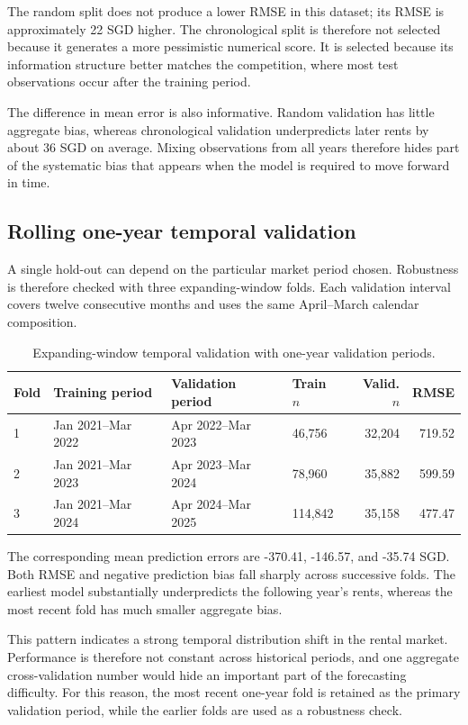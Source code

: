 \documentclass[10pt]{article}
\begin{document}
The random split does not produce a lower RMSE in this dataset; its RMSE is approximately 22 SGD higher.
The chronological split is therefore not selected because it generates a more pessimistic numerical score.
It is selected because its information structure better matches the competition, where most test observations occur after the training period.

The difference in mean error is also informative.
Random validation has little aggregate bias, whereas chronological validation underpredicts later rents by about 36 SGD on average.
Mixing observations from all years therefore hides part of the systematic bias that appears when the model is required to move forward in time.

\subsection{Rolling one-year temporal validation}

A single hold-out can depend on the particular market period chosen.
Robustness is therefore checked with three expanding-window folds.
Each validation interval covers twelve consecutive months and uses the same April--March calendar composition.

\begin{table}[h]
\centering
\small
\begin{tabular}{llllrr}
\toprule
Fold & Training period & Validation period & Train $n$ & Valid. $n$ & RMSE \\
\midrule
1 & Jan 2021--Mar 2022 & Apr 2022--Mar 2023 & 46{,}756 & 32{,}204 & 719.52 \\
2 & Jan 2021--Mar 2023 & Apr 2023--Mar 2024 & 78{,}960 & 35{,}882 & 599.59 \\
3 & Jan 2021--Mar 2024 & Apr 2024--Mar 2025 & 114{,}842 & 35{,}158 & 477.47 \\
\bottomrule
\end{tabular}
\caption{Expanding-window temporal validation with one-year validation periods.}
\label{tab:rolling-validation}
\end{table}

The corresponding mean prediction errors are -370.41, -146.57, and -35.74 SGD.
Both RMSE and negative prediction bias fall sharply across successive folds.
The earliest model substantially underpredicts the following year's rents, whereas the most recent fold has much smaller aggregate bias.

This pattern indicates a strong temporal distribution shift in the rental market.
Performance is therefore not constant across historical periods, and one aggregate cross-validation number would hide an important part of the forecasting difficulty.
For this reason, the most recent one-year fold is retained as the primary validation period, while the earlier folds are used as a robustness check.
\end{document}
